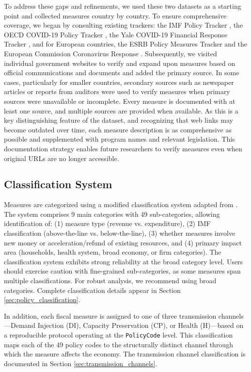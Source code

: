 \documentclass[12pt]{article}
\begin{document}
To address these gaps and refinements, we used these two datasets as a starting point and collected measures country by country. To ensure comprehensive coverage, we began by consulting existing trackers: the IMF Policy Tracker \citep{IMFPolicyResponsesCovid19}, the OECD COVID-19 Policy Tracker \citep{oecd2021covidpolicytracker}, the Yale COVID-19 Financial Response Tracker \citep{YaleCFRTV}, and for European countries, the ESRB Policy Measures Tracker \citep{ESRBCovidPolicyMeasures} and the European Commission Coronavirus Response \citep{EUCommissionCovidOverview}. Subsequently, we visited individual government websites to verify and expand upon measures based on official communications and documents and added the primary source. In some cases, particularly for smaller countries, secondary sources such as newspaper articles or reports from auditors were used to verify measures when primary sources were unavailable or incomplete. Every measure is documented with at least one source, and multiple sources are provided when available. As this is a key distinguishing feature of the dataset, and recognizing that web links may become outdated over time, each measure description is as comprehensive as possible and supplemented with program names and relevant legislation. This documentation strategy enables future researchers to verify measures even when original URLs are no longer accessible.

\subsection{Classification System}

Measures are categorized using a modified classification system adapted from \citep{LaceyMassadUtz2021}. The system comprises 9 main categories with 49 sub-categories, allowing identification of: (1) measure type (revenue vs. expenditure), (2) IMF classification (above-the-line vs. below-the-line), (3) whether measures involve new money or acceleration/refund of existing resources, and (4) primary impact area (households, health system, broad economy, or firm categories). The classification system exhibits strong reliability at the broad category level. Users should exercise caution with fine-grained sub-categories, as some measures span multiple classifications. For robust analysis, we recommend using broad categories. Complete classification details appear in Section \ref{sec:policy_classification}.

In addition, each fiscal measure is assigned to one of three transmission channels---Demand Injection (DI), Capacity Preservation (CP), or Health (H)---based on a reproducible protocol operating at the \texttt{PolicyCode} level. This classification maps each of the 49 policy codes to the structurally distinct channel through which the measure affects the economy. The transmission channel classification is documented in Section \ref{sec:transmission_channels}.
\end{document}
